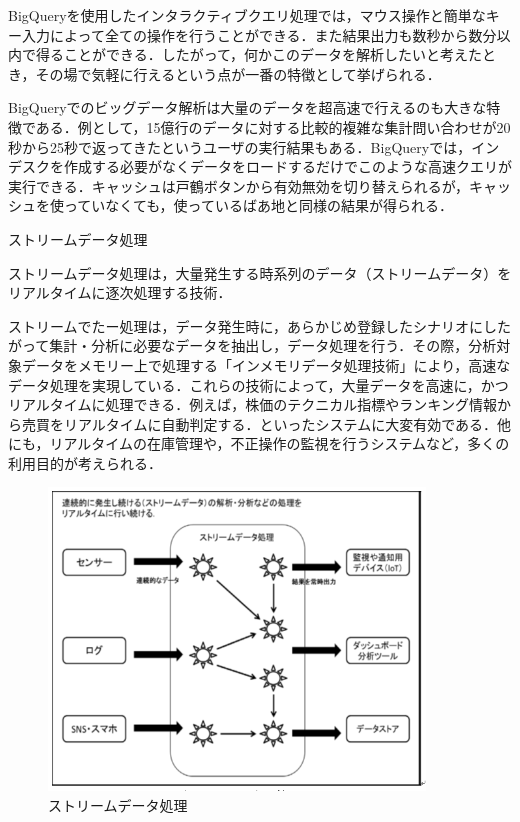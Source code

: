 BigQueryを使用したインタラクティブクエリ処理では，マウス操作と簡単なキー入力によって全ての操作を行うことができる．また結果出力も数秒から数分以内で得ることができる．したがって，何かこのデータを解析したいと考えたとき，その場で気軽に行えるという点が一番の特徴として挙げられる．

BigQueryでのビッグデータ解析は大量のデータを超高速で行えるのも大きな特徴である．例として，15億行のデータに対する比較的複雑な集計問い合わせが20秒から25秒で返ってきたというユーザの実行結果もある．BigQueryでは，インデスクを作成する必要がなくデータをロードするだけでこのような高速クエリが実行できる．キャッシュは戸鶴ボタンから有効無効を切り替えられるが，キャッシュを使っていなくても，使っているばあ地と同様の結果が得られる．\cite{bigquerystart}



ストリームデータ処理

ストリームデータ処理は，大量発生する時系列のデータ（ストリームデータ）をリアルタイムに逐次処理する技術．

ストリームでたー処理は，データ発生時に，あらかじめ登録したシナリオにしたがって集計・分析に必要なデータを抽出し，データ処理を行う．その際，分析対象データをメモリー上で処理する「インメモリデータ処理技術」により，高速なデータ処理を実現している．これらの技術によって，大量データを高速に，かつリアルタイムに処理できる．例えば，株価のテクニカル指標やランキング情報から売買をリアルタイムに自動判定する．といったシステムに大変有効である．他にも，リアルタイムの在庫管理や，不正操作の監視を行うシステムなど，多くの利用目的が考えられる．\cite{bigquerystart}

\begin{figure}[H]
\centering
\includegraphics[width=10cm]{streamdatasyori.png}
\caption{ストリームデータ処理}\label{サンプル図}
\end{figure}





